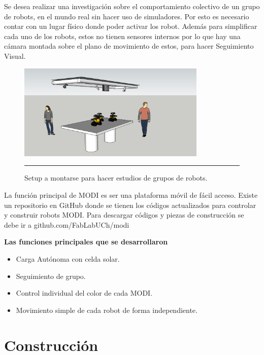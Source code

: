 Se desea realizar una investigación sobre el comportamiento colectivo de un grupo de robots, en el mundo real sin hacer uso de simuladores. Por esto  es necesario contar con un lugar físico donde poder activar los robot. Además para simplificar cada uno de los robots, estos no tienen sensores internos por lo que hay una cámara montada sobre el plano de movimiento de estos, para hacer Seguimiento Visual.
\begin{figure}[htbp]
	\centering
		\includegraphics[width=0.8\textwidth]{./Figures/setup.png}
		\rule{35em}{0.5pt}
	\caption[Setup]{Setup a montarse para hacer estudios de grupos de robots.}
	\label{fig:setup}
\end{figure}

La función principal de MODI es ser una plataforma móvil de fácil acceso. Existe un repositorio en GitHub donde se tienen los códigos actualizados para controlar y construir robots MODI.  Para descargar códigos y piezas de construcción se debe ir a github.com/FabLabUCh/modi

\textbf{Las funciones principales que se desarrollaron}

\begin{itemize}
\item Carga Autónoma con celda solar.
\item Seguimiento de grupo.
\item Control individual del color de cada MODI.
\item Movimiento simple de cada robot de forma independiente.
\end{itemize}



\section{Construcción}

